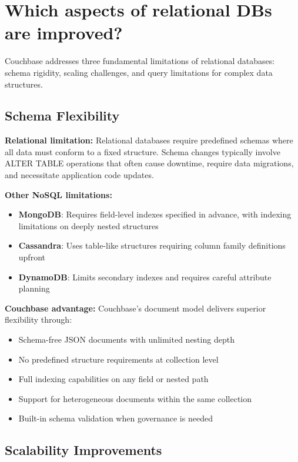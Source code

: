 \chapter{Which aspects of relational DBs are improved?}

Couchbase addresses three fundamental limitations of relational databases: schema rigidity, scaling challenges, and query limitations for complex data structures.

\section{Schema Flexibility}

\textbf{Relational limitation:} Relational databases require predefined schemas where all data must conform to a fixed structure. Schema changes typically involve ALTER TABLE operations that often cause downtime, require data migrations, and necessitate application code updates.


\textbf{Other NoSQL limitations:}
\begin{itemize}
  \item \textbf{MongoDB}: Requires field-level indexes specified in advance, with indexing limitations on deeply nested structures
  \item \textbf{Cassandra}: Uses table-like structures requiring column family definitions upfront
  \item \textbf{DynamoDB}: Limits secondary indexes and requires careful attribute planning
\end{itemize}

\textbf{Couchbase advantage:} Couchbase's document model delivers superior flexibility through:
\begin{itemize}
  \item Schema-free JSON documents with unlimited nesting depth
  \item No predefined structure requirements at collection level
  \item Full indexing capabilities on any field or nested path
  \item Support for heterogeneous documents within the same collection
  \item Built-in schema validation when governance is needed
\end{itemize}

\section{Scalability Improvements}

